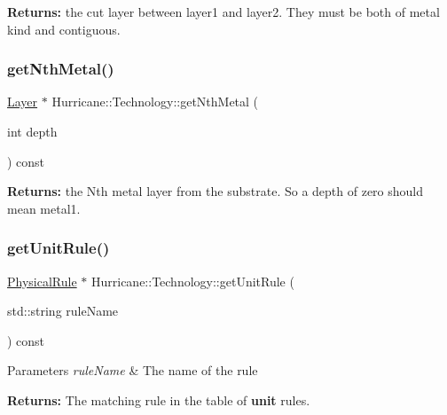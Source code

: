 {\bfseries Returns\+:} the cut layer between {\ttfamily layer1} and {\ttfamily layer2}. They must be both of metal kind and contiguous. \mbox{\label{classHurricane_1_1Technology_a81a3f3e479aeb686c61a2d0fa2931f3b}} 
\subsubsection{\texorpdfstring{get\+Nth\+Metal()}{getNthMetal()}}
{\footnotesize\ttfamily \mbox{\hyperlink{classHurricane_1_1Layer}{Layer}} $\ast$ Hurricane\+::\+Technology\+::get\+Nth\+Metal (\begin{DoxyParamCaption}\item[{int}]{depth }\end{DoxyParamCaption}) const}

{\bfseries Returns\+:} the {\ttfamily Nth} metal layer from the substrate. So a {\ttfamily depth} of zero should mean {\ttfamily metal1}. \mbox{\label{classHurricane_1_1Technology_a6ab76e8a246a10a395d68341bca9ea96}} 
\subsubsection{\texorpdfstring{get\+Unit\+Rule()}{getUnitRule()}}
{\footnotesize\ttfamily \mbox{\hyperlink{classHurricane_1_1PhysicalRule}{Physical\+Rule}} $\ast$ Hurricane\+::\+Technology\+::get\+Unit\+Rule (\begin{DoxyParamCaption}\item[{std\+::string}]{rule\+Name }\end{DoxyParamCaption}) const}


\begin{DoxyParams}{Parameters}
{\em rule\+Name} & The name of the rule\\
\hline
\end{DoxyParams}
{\bfseries Returns\+:} The matching rule in the table of {\bfseries unit} rules. \mbox{\label{classHurricane_1_1Technology_a21ef6f7507785a587e56aecc52a0c0ee}} 
